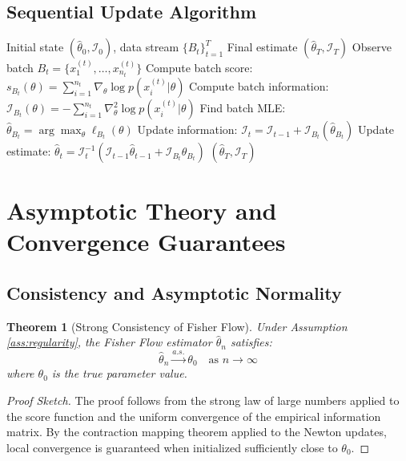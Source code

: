 \documentclass[11pt]{article}
\newtheorem{theorem}{Theorem}
\begin{document}
\subsection{Sequential Update Algorithm}

\begin{algorithm}[h]
\caption{Fisher Flow Sequential Update}
\label{alg:lpi_sequential}
\begin{algorithmic}[1]
\Require Initial state $(\hat{\theta}_0, \mathcal{I}_0)$, data stream $\{B_t\}_{t=1}^T$
\Ensure Final estimate $(\hat{\theta}_T, \mathcal{I}_T)$
\State Observe batch $B_t = \{x_1^{(t)}, \ldots, x_{n_t}^{(t)}\}$
\State Compute batch score: $s_{B_t}(\theta) = \sum_{i=1}^{n_t} \nabla_\theta \log p(x_i^{(t)}|\theta)$
\State Compute batch information: $\mathcal{I}_{B_t}(\theta) = -\sum_{i=1}^{n_t} \nabla^2_\theta \log p(x_i^{(t)}|\theta)$
\State Find batch MLE: $\hat{\theta}_{B_t} = \arg\max_\theta \ell_{B_t}(\theta)$
\State Update information: $\mathcal{I}_t = \mathcal{I}_{t-1} + \mathcal{I}_{B_t}(\hat{\theta}_{B_t})$
\State Update estimate: $\hat{\theta}_t = \mathcal{I}_t^{-1}(\mathcal{I}_{t-1}\hat{\theta}_{t-1} + \mathcal{I}_{B_t}\hat{\theta}_{B_t})$
\EndFor
\State \Return $(\hat{\theta}_T, \mathcal{I}_T)$
\end{algorithmic}
\end{algorithm}

\section{Asymptotic Theory and Convergence Guarantees}

\subsection{Consistency and Asymptotic Normality}

\begin{theorem}[Strong Consistency of Fisher Flow]
\label{thm:consistency}
Under Assumption \ref{ass:regularity}, the Fisher Flow estimator $\hat{\theta}_n$ satisfies:
\begin{equation}
\hat{\theta}_n \xrightarrow{a.s.} \theta_0 \quad \text{as } n \to \infty
\end{equation}
where $\theta_0$ is the true parameter value.
\end{theorem}

\begin{proof}[Proof Sketch]
The proof follows from the strong law of large numbers applied to the score function and the uniform convergence of the empirical information matrix. By the contraction mapping theorem applied to the Newton updates, local convergence is guaranteed when initialized sufficiently close to $\theta_0$.
\end{proof}
\end{document}
